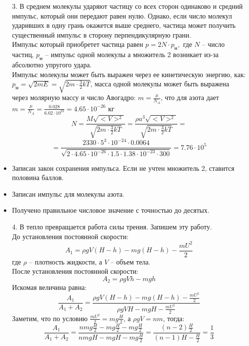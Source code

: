 \begin{enumerate}
\item[3.] В среднем молекулы ударяют частицу со всех сторон одинаково и средний импульс, который они передают равен нулю. Однако, если число молекул ударивших в одну грань окажется выше среднего, частица может получить существенный импульс в сторону перпендикулярную грани.\\
Импульс который приобретет частица равен $p=2N\cdot p_\text{м},$ где $N$ – число частиц, $p_\text{м}$ – импульс одной молекулы а множитель 2 возникает из-за абсолютно упругого удара.\\
Импульс молекулы может быть выражен через ее кинетическую энергию, как:\\
$p_\text{м}=\sqrt{2mE}=\sqrt{2m\cdot\frac{3}{2}kT}$, масса одной молекулы может быть выражена через молярную массу и число Авогадро: $m=\frac{\mu}{N_A}$, что для азота дает $m=\frac{\mu}{N_A}=\frac{0.028}{6.02\cdot10^{23}}=4.65\cdot10^{-26}$ кг
$$N=\frac{M\sqrt{<V>^2}}{\sqrt{2m\cdot\frac{3}{2}kT}}=\frac{\rho a^3\sqrt{<V>^2}}{\sqrt{2m\cdot\frac{3}{2}kT}}=$$
$$=\frac{2330\cdot5^3\cdot10^{-24}\cdot0.0064}{\sqrt{2\cdot4.65\cdot10^{-26}\cdot1.5\cdot1.38\cdot10^{-23}\cdot300}}=7.76\cdot10^5$$
\end{enumerate}
\begin{itemize}
\item Записан закон сохранения импульса. Если не учтен множитель 2, ставится половина баллов.
\item Записан импульс для молекулы азота.
\item Получено правильное числовое значение с точностью до десятых.
\end{itemize}
\begin{enumerate}
\item[4.] В тепло превращается работа силы трения. Запишем эту работу.\\
До установления постоянной скорости:
$$A_1=\rho gV(H-h)-mg(H-h)-\frac{mU^2}{2}$$
где $\rho$ – плотность жидкости, а $V$ – объем тела.\\
После установления постоянной скорости:
$$A_2=\rho gVh-mgh$$
Искомая величина равна:
$$\frac{A_1}{A_1+A_2}=\frac{\rho gV(H-h)-mg(H-h)-\frac{mU^2}{2}}{\rho gVH-mgH-\frac{mU^2}{2}}$$
Заметим, что по условию $\frac{mU^2}{2}=mg\frac{H}{2}$, а $\rho gV=nm$, тогда:
$$\frac{A_1}{A_1+A_2}=\frac{nmg\frac{H}{2}-mg\frac{H}{2}-mg\frac{H}{2}}{nmgH-mgH-mg\frac{H}{2}}=\frac{(n-2)\frac{H}{2}}{(n-1)H-\frac{H}{2}}=\frac{1}{3}$$
\end{enumerate}
